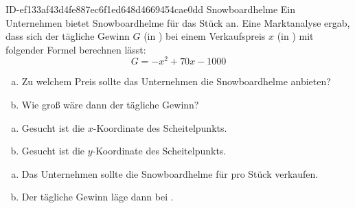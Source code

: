 \begin{exercise}
      {ID-ef133af43d4fe887ec6f1ed648d4669454cae0dd}
      {Snowboardhelme}
  \ifproblem\problem
    Ein Unternehmen bietet Snowboardhelme für  das Stück an. Eine
    Marktanalyse ergab, dass sich der tägliche Gewinn $G$ (in \officialeuro)
    bei einem Verkaufspreis $x$ (in \officialeuro) mit folgender Formel
    berechnen lässt:
    \begin{equation*}
      G=-x^{2}+70x-1000
    \end{equation*}
    \begin{enumerate}[a)]
      \item Zu welchem Preis sollte das Unternehmen die Snowboardhelme
            anbieten?
      \item Wie groß wäre dann der tägliche Gewinn?
    \end{enumerate}
  \fi
  \ifoutline\outline
    \begin{enumerate}[a)]
      \item Gesucht ist die $x$-Koordinate des Scheitelpunkts.
      \item Gesucht ist die $y$-Koordinate des Scheitelpunkts.
    \end{enumerate}
  \fi
  \ifoutcome\outcome
    \begin{enumerate}[a)]
      \item Das Unternehmen sollte die Snowboardhelme für  pro Stück verkaufen.
      \item Der tägliche Gewinn läge dann bei .
    \end{enumerate}
  \fi
\end{exercise}
